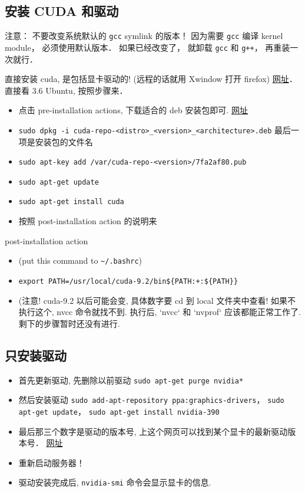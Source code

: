
\subsection{安装 CUDA 和驱动}
注意： 不要改变系统默认的 \verb|gcc| symlink 的版本！ 因为需要 \verb|gcc| 编译 kernel module， 必须使用默认版本． 如果已经改变了， 就卸载 \verb|gcc| 和 \verb|g++|， 再重装一次就行．

直接安装 cuda, 是包括显卡驱动的! (远程的话就用 Xwindow 打开 firefox)
\href{https://docs.nvidia.com/cuda/cuda-installation-guide-linux/index.html#ubuntu-installation}{网址}． 直接看 3.6 Ubuntu, 按照步骤来．
\begin{itemize}
\item 点击 pre-installation actions, 下载适合的 deb 安装包即可. \href{https://developer.nvidia.com/cuda-downloads}{网址}
\item \verb`sudo dpkg -i cuda-repo-<distro>_<version>_<architecture>.deb`   最后一项是安装包的文件名
\item \verb`sudo apt-key add /var/cuda-repo-<version>/7fa2af80.pub`
\item \verb`sudo apt-get update`
\item \verb`sudo apt-get install cuda`
\item 按照 post-installation action 的说明来
\end{itemize}

post-installation action
\begin{itemize}
\item (put this command to \verb|~/.bashrc|)
\item \verb`export PATH=/usr/local/cuda-9.2/bin${PATH:+:${PATH}}`
\item (注意! cuda-9.2 以后可能会变, 具体数字要 cd 到 local 文件夹中查看!
如果不执行这个, nvcc 命令就找不到. 执行后, `nvcc` 和 `nvprof` 应该都能正常工作了.
剩下的步骤暂时还没有进行.
\end{itemize}

\subsection{只安装驱动}
\begin{itemize}
\item 首先更新驱动, 先删除以前驱动 \verb|sudo apt-get purge nvidia*|
\item 然后安装驱动 \verb|sudo add-apt-repository ppa:graphics-drivers|， \verb|sudo apt-get update|， \verb|sudo apt-get install nvidia-390|
\item 最后那三个数字是驱动的版本号, 上这个网页可以找到某个显卡的最新驱动版本号． \href{http://www.nvidia.com/Download/index.aspx?lang=en-us}{网址}
\item 重新启动服务器！
\item 驱动安装完成后, \verb|nvidia-smi| 命令会显示显卡的信息.
\end{itemize}
